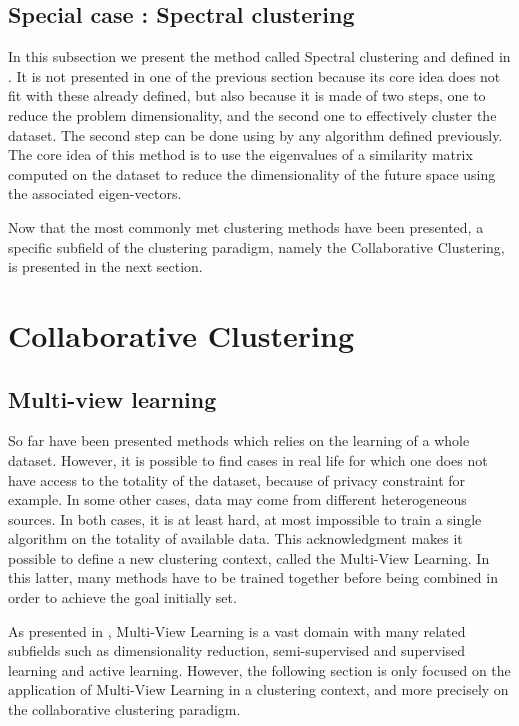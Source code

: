\documentclass[a4paper]{report}
\begin{document}
    \subsection{Special case : Spectral clustering}

    In this subsection we present the method called Spectral clustering and defined in \cite{Ng01onspectral}. It is not presented in one of the previous section because its core idea does not fit with these already defined, but also because it is made of two steps, one to reduce the problem dimensionality, and the second one to effectively cluster the dataset. The second step can be done using by any algorithm defined previously. The core idea of this method is to use the eigenvalues of a similarity matrix computed on the dataset to reduce the dimensionality of the future space using the associated eigen-vectors.

    Now that the most commonly met clustering methods have been presented, a specific subfield of the clustering paradigm, namely the Collaborative Clustering, is presented in the next section.

    \section{Collaborative Clustering}
    \label{sec:soa_cc}

    \subsection{Multi-view learning}

    So far have been presented methods which relies on the learning of a whole dataset. However, it is possible to find cases in real life for which one does not have access to the totality of the dataset, because of privacy constraint for example. In some other cases, data may come from different heterogeneous sources. In both cases, it is at least hard, at most impossible to train a single algorithm on the totality of available data. This acknowledgment makes it possible to define a new clustering context, called the Multi-View Learning. In this latter, many methods have to be trained together before being combined in order to achieve the goal initially set.
    
    As presented in \cite{sun2013survey}, Multi-View Learning is a vast domain with many related subfields such as dimensionality reduction, semi-supervised and supervised learning and active learning. However, the following section is only focused on the application of Multi-View Learning in a clustering context, and more precisely on the collaborative clustering paradigm.
    
\end{document}
